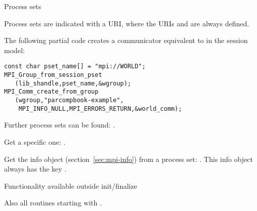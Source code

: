 \begin{mpifour}
 {Process sets}

Process sets are indicated with a \acf{URI},
where the \acp{URI}  and 
are always defined.

The following partial code creates a communicator equivalent to 
in the session model:
\begin{lstlisting}
const char pset_name[] = "mpi://WORLD";
MPI_Group_from_session_pset
   (lib_shandle,pset_name,&wgroup);
MPI_Comm_create_from_group
   (wgroup,"parcompbook-example",
    MPI_INFO_NULL,MPI_ERRORS_RETURN,&world_comm);
\end{lstlisting}

Further process sets can be found: .

Get a specific one: .

Get the info object (section~\ref{sec:mpi-info}) from a process set:
.
This info object always has the key .

\begin{comment}
7.2.4 When using the Sessions Model (Section 11.3) for initialization of MPI
re- sources, MPI_COMM_WORLD and MPI_COMM_SELF are not valid for use as
a communica- tor.

11.3 MPI objects derived from the Sessions Model shall not be
intermixed in a single MPI procedure call with MPI objects derived
from the World Model.

Are those two at odds? The first one seems to imply that in the second
statement objects from the world model can't even exist.
\end{comment}

\end{mpifour}

 {Functionality available outside init/finalize}

\begin{raggedlist}
\end{raggedlist}
Also all routines starting with .
